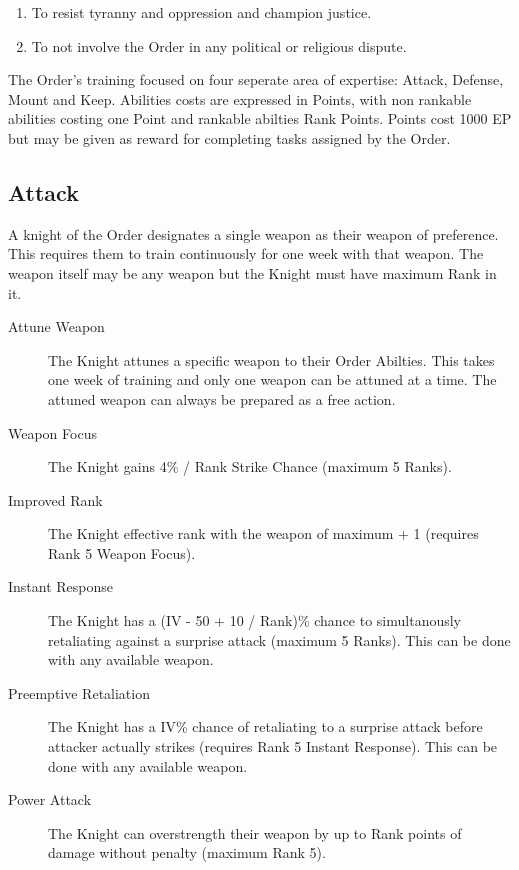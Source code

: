 \documentclass[a4paper]{article}
\begin{document}
\begin{multicols*}{3}
\begin{enumerate}
\item To resist tyranny and oppression and champion justice.

\item To not involve the Order in any political or religious dispute.

\end{enumerate}

The Order's training focused on four seperate area of expertise:
Attack, Defense, Mount and Keep.  Abilities costs are expressed in
Points, with non rankable abilities costing one Point and rankable
abilties Rank Points.  Points cost 1000 EP but may be given as reward
for completing tasks assigned by the Order.

\subsection{Attack}

A knight of the Order designates a single weapon as their weapon of
preference.  This requires them to train continuously for one week
with that weapon.  The weapon itself may be any weapon but the Knight
must have maximum Rank in it.


\begin{description}

\item[Attune Weapon] The Knight attunes a specific weapon to their
Order Abilties.  This takes one week of training and only one weapon
can be attuned at a time.  The attuned weapon can always be prepared
as a free action.

\item[Weapon Focus] The Knight gains 4\% / Rank Strike Chance (maximum
5 Ranks).

\item[Improved Rank] The Knight effective rank with the weapon of
maximum + 1 (requires Rank 5 Weapon Focus).

\item[Instant Response] The Knight has a (IV - 50 + 10 / Rank)\%
chance to simultanously retaliating against a surprise attack (maximum
5 Ranks).  This can be done with any available weapon.

\item[Preemptive Retaliation] The Knight has a IV\% chance of
retaliating to a surprise attack before attacker actually strikes
(requires Rank 5 Instant Response).  This can be done with any
available weapon.

\item[Power Attack] The Knight can overstrength their weapon by up to
Rank points of damage without penalty (maximum Rank 5).


\end{description}
\end{multicols*}
\end{document}
